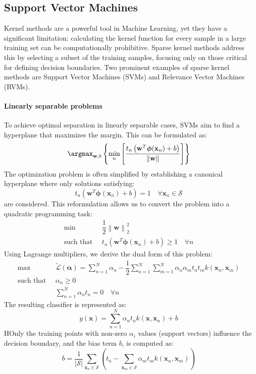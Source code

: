 \subsection{Support Vector Machines}
Kernel methods are a powerful tool in Machine Learning, yet they have a significant limitation: calculating the kernel function for every sample in a large training set can be computationally prohibitive.
Sparse kernel methods address this by selecting a subset of the training samples, focusing only on those critical for defining decision boundaries.
Two prominent examples of sparse kernel methods are Support Vector Machines (SVMs) and Relevance Vector Machines (RVMs).

\paragraph*{Linearly separable problems}
To achieve optimal separation in linearly separable cases, SVMs aim to find a hyperplane that maximizes the margin. 
This can be formulated as:
\[\argmax_{\mathbf{w},b}\left\{\min_n\left[\dfrac{t_n\left(\mathbf{w}^T\boldsymbol{\phi}(\mathbf{x}_n)+b\right)}{\left\lVert \mathbf{w}\right\rVert }\right]\right\}\]
The optimization problem is often simplified by establishing a canonical hyperplane where only solutions satisfying:
\[t_n\left(\mathbf{w}^T\boldsymbol{\phi}(\mathbf{x}_n)+b\right)=1\quad \forall\mathbf{x}_n\in\mathcal{S}\]
are considered. 
This reformulation allows us to convert the problem into a quadratic programming task:
\begin{align*}
    \min                      \:&\: \dfrac{1}{2}{\left\lVert \mathbf{w}\right\rVert}_2^2          \\
    \text{such that }           &\: t_n\left(\mathbf{w}^T\boldsymbol{\phi}(\mathbf{x}_n)+b\right)\geq 1 \quad\forall n        
\end{align*}  
Using Lagrange multipliers, we derive the dual form of this problem:
\begin{align*}
    \max                      \:&\: \tilde{\mathcal{L}}(\boldsymbol{\alpha})=\sum_{n=1}^N \alpha_n-\dfrac{1}{2}\sum_{n=1}^N\sum_{m=1}^N \alpha_n\alpha_m t_n t_m k(\mathbf{x}_n,\mathbf{x}_m)          \\
    \text{such that }           &\: \alpha_n\geq 0 \\
                                &\: \sum_{n=1}^{N}{\alpha_n t_n = 0} \quad \forall n
\end{align*}  
The resulting classifier is represented as:
\[y(\mathbf{x})=\sum_{n=1}^{N}\alpha_n t_n k(\mathbf{x},\mathbf{x}_n)+b\]
HOnly the training points with non-zero $\alpha_i$ values (support vectors) influence the decision boundary, and the bias term $b$, is computed as:
\[b=\dfrac{1}{\left\lvert \mathcal{S}\right\rvert }\sum_{\mathbf{x}_n\in\mathcal{S}} \left(t_n-\sum_{\mathbf{x}_m\in\mathcal{S}}\alpha_m t_m k(\mathbf{x}_n,\mathbf{x}_m)\right)\]

